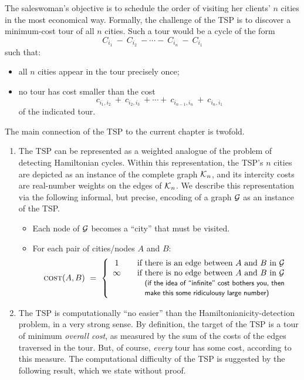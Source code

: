 The saleswoman's objective is to schedule the order of visiting her
clients' $n$ cities in the most economical way.  Formally, the
challenge of the TSP is to discover a minimum-cost tour of all $n$
cities.  Such a tour would be a cycle of the form
\[ C_{i_1} \ - \ C_{i_2} \ - \cdots - \ C_{i_n} \ - \ C_{i_1} \]
such that:
\begin{itemize}
\item
all $n$ cities appear in the tour precisely once;
\item
no tour has cost smaller than the cost
\[ c_{i_1,i_2} \ + \ c_{i_2, i_3} \ + \cdots + \  
c_{i_{n-1}, i_n} \ + \ c_{i_n, i_1} \]
of the indicated tour.
\end{itemize}
The main connection of the TSP to the current chapter is twofold.
\begin{enumerate}
\item
The TSP can be represented as a weighted analogue of the problem of
detecting Hamiltonian cycles.  Within this representation, the TSP's
$n$ cities are depicted as an instance of the complete graph $\mbox{$\cal K$}_n$,
and its intercity costs are real-number weights on the edges of
$\mbox{$\cal K$}_n$.  We describe this representation via the following informal,
but precise, encoding of a graph $\mbox{$\cal G$}$ as an instance of the TSP.
  \begin{itemize}
  \item
Each node of $\mbox{$\cal G$}$ becomes a ``city'' that must be visited.
  \item
For each pair of cities/nodes $A$ and $B$:
\[ \mbox{\sc cost}(A,B) \ = \ \left\{
\begin{array}{ccl}
1 & & \mbox{if there is an edge between $A$ and $B$ in $\g$} \\
\infty & & \mbox{if there is no edge between $A$ and $B$ in $\g$} \\
       & & \mbox{\small\sf (if the idea of ``infinite'' cost bothers
  you, then} \\
       & & \mbox{\small\sf make this some ridiculousy large number)}
\end{array}
\right.
\]
  \end{itemize}

\item
The TSP is computationally ``no easier'' than the
Hamiltonianicity-detection problem, in a very strong sense.  By
definition, the target of the TSP is a tour of minimum {\em overall
  cost}, as measured by the sum of the costs of the edges traversed in
the tour.  But, of course, {\em every} tour has some cost, according
to this measure.  The computational difficulty of the TSP is suggested
by the following result, which we state without proof.
\end{enumerate}

